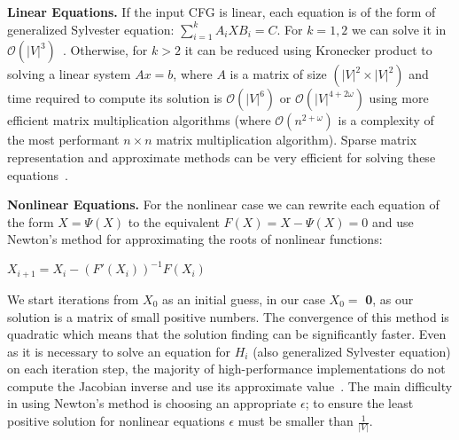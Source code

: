 \documentclass[sigconf, 10pt]{acmart}
\begin{document}
\textbf{Linear Equations.}
If the input CFG is linear, each equation is of the form of generalized Sylvester equation: \linebreak $\sum_{i = 1}^{k} A_iXB_i = C$.
For $k = 1, 2$ we can solve it in $\mathcal{O}(|V|^3)$~\cite{Bartels:1972:SME:361573.361582}.
Otherwise, for $k > 2$ it can be reduced using Kronecker product to solving a linear system $Ax = b$, where $A$ is a matrix of size $(|V|^2 \times |V|^2)$ and time required to compute its solution is $\mathcal{O}(|V|^6)$ or $\mathcal{O}(|V|^{4 + 2\omega})$ using more efficient matrix multiplication algorithms (where $\mathcal{O}(n^{2+\omega})$ is a complexity of the most performant $n\times n$ matrix multiplication algorithm).
Sparse matrix representation and approximate methods can be very efficient for solving these equations~\cite{bouhamidi2008}.


\textbf{Nonlinear Equations.}
For the nonlinear case we can rewrite each equation of the form $X = \Psi(X)$ to the equivalent $F(X) = X - \Psi(X) = 0$ and use Newton's method  for approximating the roots of nonlinear functions:
\begin{center}
$X_{i+1} = X_i - (F'(X_i))^{-1}F(X_i)$
\end{center}

We start iterations from $X_0$ as an initial guess, in our case $X_0 = $ \textbf{0}, as our solution is a matrix of small positive numbers.
The convergence of this method is quadratic which means that the solution finding can be significantly faster.
Even as it is necessary to solve an equation for $H_i$ (also generalized Sylvester equation) on each iteration step, the majority of high-performance implementations do not compute the Jacobian inverse and use its approximate value~\cite{knoll2004jacobian}.
The main difficulty in using Newton's method is choosing an appropriate $\epsilon$; to ensure the least positive solution for nonlinear equations $\epsilon$ must be smaller than $\frac{1}{|V|}$.
\end{document}
